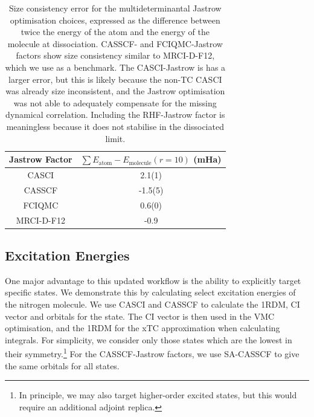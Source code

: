 \begin{table}[!h]
    \centering
    \begin{tabular}{c|c}
        Jastrow Factor & $\sum E_\mathrm{atom} - E_\mathrm{molecule}(r=10)$ (mHa) \\
        \hline
        CASCI & 2.1(1) \\
        CASSCF & -1.5(5) \\
        FCIQMC & 0.6(0) \\
        \bottomrule
        MRCI-D-F12 & -0.9
    \end{tabular}
    \caption{Size consistency error for the multideterminantal Jastrow optimisation choices, expressed as the difference between twice the energy of the atom and the energy of the molecule at dissociation. CASSCF- and FCIQMC-Jastrow factors show size consistency similar to MRCI-D-F12, which we use as a benchmark. The CASCI-Jastrow is has a larger error, but this is likely because the non-TC CASCI was already size inconsistent, and the Jastrow optimisation was not able to adequately compensate for the missing dynamical correlation. Including the RHF-Jastrow factor is meaningless because it does not stabilise in the dissociated limit.  }
    \label{tbl:size-consistency}
\end{table}


\subsection{Excitation Energies}

One major advantage to this updated workflow is the ability to explicitly target specific states. We demonstrate this by calculating select excitation energies of the nitrogen molecule. We use CASCI and CASSCF to calculate the 1RDM, CI vector and orbitals for the state. The CI vector is then used in the VMC optimisation, and the 1RDM for the xTC approximation when calculating integrals. For simplicity, we consider only those states which are the lowest in their symmetry.\footnote{In principle, we may also target higher-order excited states, but this would require an additional adjoint replica.\supercite{bluntExcitedstateApproachFull2015}}
For the CASSCF-Jastrow factors, we use \gls{SA}-CASSCF to give the same orbitals for all states.

